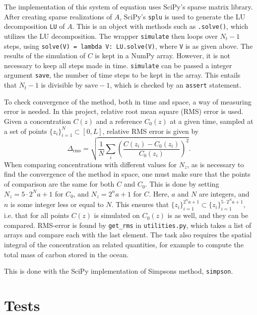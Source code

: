 \documentclass{article}
\begin{document}
    The implementation of this system of equation uses SciPy's sparse matrix library.
    After creating sparse realizations of $A$, SciPy's \verb|splu| is used to generate the LU decomposition \verb|LU| of $A$.
    This is an object with methods such as \verb|.solve()|, which utilizes the LU decomposition.
    The wrapper \verb|simulate| then loops over $N_t-1$ steps, using \verb|solve(V) = lambda V: LU.solve(V)|, where \verb|V| is as given above.
    The results of the simulation of $C$ is kept in a NumPy array.
    However, it is not necessary to keep all steps made in time.
    \verb|simulate| can be passed a integer argument \verb|save|, the number of time steps to be kept in the array.
    This entails that $N_t-1$ is divisible by $\mathrm{save}-1$, which is checked by an \verb|assert| statement.
    
    To check convergence of the method, both in time and space, a way of measuring error is needed.
    In this project, relative root mean square (RMS) error is used.
    Given a concentration $C(z)$ and a reference $C_0(z)$ at a given time, sampled at a set of points $\{z_i\}_{i=1}^N \subset [0, L]$, relative RMS error is given by
    \begin{equation*}
        \Delta_\mathrm{rms} = \sqrt{\frac{1}{N}\sum_i \left(\frac{C(z_i) - C_0(z_i)}{C_0(z_i)}\right)^2}.
    \end{equation*}
    When comparing concentrations with different values for $N_z$, as is necessary to find the convergence of the method in space, one must make sure that the points of comparison are the same for both $C$ and $C_0$.
    This is done by setting $N_z = 5\cdot 2^Na + 1$ for $C_0$, and $N_z = 2^n a + 1$ for $C$.
    Here, $a$ and $N$ are integers, and $n$ is some integer less or equal to $N$.
    This ensures that $\{z_i\}_{i=1}^{2^na+1} \subset \{z_i\}_{i=1}^{5\cdot2^Na+1}$, i.e. that for all points $C(z)$ is simulated on $C_0(z)$ is as well, and they can be compared.
    RMS-error is found by \verb|get_rms| in \verb|utilities.py|, which takes a list of arrays and compare each with the last element.
    The task also requires the spatial integral of the concentration an related quantities, for example to compute the total mass of carbon stored in the ocean.

    This is done with the SciPy implementation of Simpsons method, \verb|simpson|.


    \section*{Tests}
\end{document}
